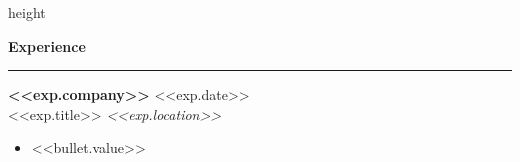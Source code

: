 \documentclass[10pt]{article}
\newcommand{\cvsection}[1]{
  \vspace{6pt}
  {\large\bf #1}
  \vspace{2pt}
  \hrule
  \vspace{5pt}
}
\newcommand{\tagged}[2]{\hypertarget{#1}{#2}}
\begin{document}
\hspace{4pt}%
\textcolor{linecolor}{\vrule width 0.4pt height \textheight}%
\hspace{8pt}%
\begin{minipage}[t]{0.65\textwidth}
\vspace{0pt}

\cvsection{Experience}
{\fontsize{10}{13}\bf \tagged{<<exp.id>>_company}{<<exp.company>>}} \hfill {\fontsize{8.5}{11}\selectfont \tagged{<<exp.id>>_date}{<<exp.date>>}} \\[-1pt]
{\fontsize{9}{12}\selectfont \tagged{<<exp.id>>_title}{<<exp.title>>}} \hfill {\fontsize{8.5}{11}\selectfont\textit{\tagged{<<exp.id>>_location}{<<exp.location>>}}}
\vspace{1pt}
{\fontsize{8.5}{12}\selectfont
\begin{itemize}[leftmargin=1.2em, noitemsep, topsep=1pt, parsep=0pt]
  \item \tagged{<<bullet.id>>}{<<bullet.value>>}
\end{itemize}
}
\vspace{5pt}

\end{minipage}
\end{document}
